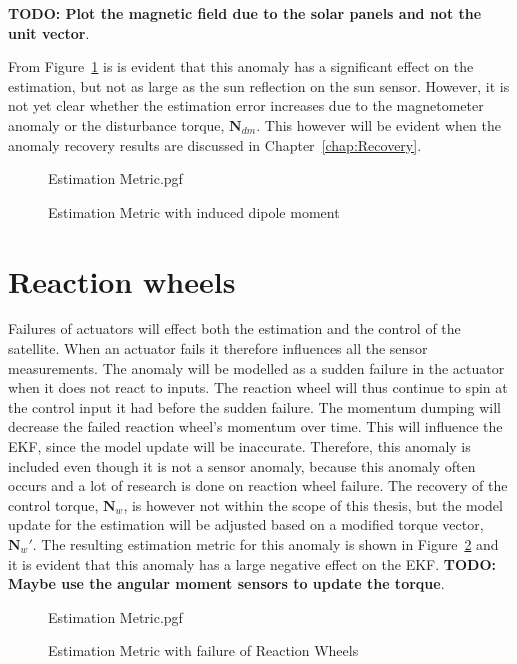 \textbf{TODO: Plot the magnetic field due to the solar panels and not the unit vector}.

From Figure~\ref{fig:solarPanelDipoleOnEstimation} is is evident that this anomaly has a significant effect on the estimation, but not as large as the sun reflection on the sun sensor. However, it is not yet clear whether the estimation error increases due to the magnetometer anomaly or the disturbance torque, $\mathbf{N}_{dm}$. This however will be evident when the anomaly recovery results are discussed in Chapter~\ref{chap:Recovery}.

\begin{figure}[!htb]
	\centering
	
	{Estimation Metric.pgf}
	
	\caption{Estimation Metric with induced dipole moment}
	\label{fig:solarPanelDipoleOnEstimation}
\end{figure}

\section{Reaction wheels}
Failures of actuators will effect both the estimation and the control of the satellite. When an actuator fails it therefore influences all the sensor measurements. The anomaly will be modelled as a sudden failure in the actuator when it does not react to inputs. The reaction wheel will thus continue to spin at the control input it had before the sudden failure. The momentum dumping will decrease the failed reaction wheel's momentum over time. This will influence the EKF, since the model update will be inaccurate. Therefore, this anomaly is included even though it is not a sensor anomaly, because this anomaly often occurs and a lot of research is done on reaction wheel failure. The recovery of the control torque, $\mathbf{N}_w$, is however not within the scope of this thesis, but the model update for the estimation will be adjusted based on a modified torque vector, $\mathbf{N}_w'$. The resulting estimation metric for this anomaly is shown in Figure~\ref{fig:catastrophicReactionWheels} and it is evident that this anomaly has a large negative effect on the EKF. \textbf{TODO: Maybe use the angular moment sensors to update the torque}.

\begin{figure}[!htb]
\centering

{Estimation Metric.pgf}

\caption{Estimation Metric with failure of Reaction Wheels}
\label{fig:catastrophicReactionWheels}
\end{figure}

